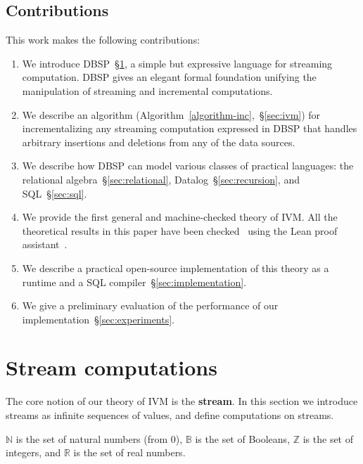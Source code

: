 \documentclass[twocolumn
]{svjour3}
\numberwithin{equation}{section}
\newcommand{\dbsp}{DBSP\xspace}
\newcommand{\Z}{\mathbb{Z}}  %
\newcommand{\N}{\mathbb{N}}  %
\newcommand{\B}{\mathbb{B}}  %
\newcommand{\R}{\mathbb{R}}  %
\newcommand{\secref}[1]{\S\ref{#1}}  %
\newcommand{\refsec}[1]{\secref{#1}}
\begin{document}
\vspace{-3ex}

\subsection{Contributions}

This work makes the following contributions:
\begin{enumerate}
  \item We introduce \dbsp~\refsec{sec:streams}, a simple but
    expressive language for streaming computation. \dbsp gives an
    elegant formal foundation unifying the manipulation of streaming
    and incremental computations.
  \item We describe an algorithm
    (Algorithm~\ref{algorithm-inc},~\refsec{sec:ivm}) for
    incrementalizing any streaming computation expressed in \dbsp
    that handles arbitrary insertions and deletions from any of the
    data sources.
  \item We describe how \dbsp can model various classes of practical
    languages: the relational algebra~\refsec{sec:relational},
    Datalog~\refsec{sec:recursion}, and SQL~\refsec{sec:sql}.
  \item We provide the first general and machine-checked theory of
    IVM.  All the theoretical results in this paper have been
    checked~\cite{dbsp-theory} using the Lean proof
    assistant~\cite{moura-cade15}.
  \item We describe a practical open-source implementation of this
    theory as a runtime and a SQL
    compiler~\refsec{sec:implementation}.
  \item We give a preliminary evaluation of the performance of our
    implementation~\refsec{sec:experiments}.
\end{enumerate}

%
\section{Stream computations}\label{sec:streams}

The core notion of our theory of IVM is the \textbf{stream}.  In this
section we introduce streams as infinite sequences of values, and
define computations on streams.

$\N$ is the set of natural numbers (from 0), $\B$ is the set of
Booleans, $\Z$ is the set of integers, and $\R$ is the set of real
numbers.

\vspace{-3ex}
\end{document}

